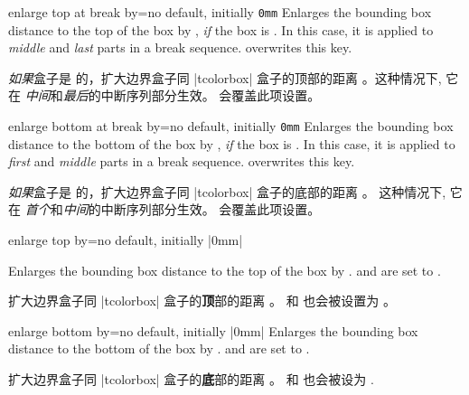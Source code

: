



\begin{docTcbKey}{enlarge top at break by}{=}{no default, initially \texttt{0mm}}
Enlarges the bounding box distance to the top of the box by ,
\emph{if} the box is .
In this case, it is applied to \emph{middle} and \emph{last} parts in a
break sequence.
 overwrites this key.

\emph{如果}盒子是 的，扩大边界盒子同 |tcolorbox| 盒子的顶部的距离 。这种情况下, 它在 \emph{中间}和\emph{最后}的中断序列部分生效。  会覆盖此项设置。
\end{docTcbKey}


\begin{docTcbKey}{enlarge bottom at break by}{=}{no default, initially \texttt{0mm}}
Enlarges the bounding box distance to the bottom of the box by ,
\emph{if} the box is .
In this case, it is applied to \emph{first} and \emph{middle} parts in a
break sequence.  overwrites this key.

\emph{如果}盒子是 的，扩大边界盒子同 |tcolorbox| 盒子的底部的距离 。
这种情况下, 它在 \emph{首个}和\emph{中间}的中断序列部分生效。
 会覆盖此项设置。
\end{docTcbKey}




\begin{docTcbKey}{enlarge top by}{=}{no default, initially |0mm|}

Enlarges the bounding box distance to the top of the box by .
 and
 are set to .

扩大边界盒子同 |tcolorbox| 盒子的{\bf 顶}部的距离 。
 和
 也会被设置为 。
\end{docTcbKey}


\begin{docTcbKey}{enlarge bottom by}{=}{no default, initially |0mm|}
Enlarges the bounding box distance to the bottom of the box by .
 and
 are set to .

扩大边界盒子同 |tcolorbox| 盒子的{\bf 底}部的距离 。
 和
 也会被设为 .
\end{docTcbKey}



